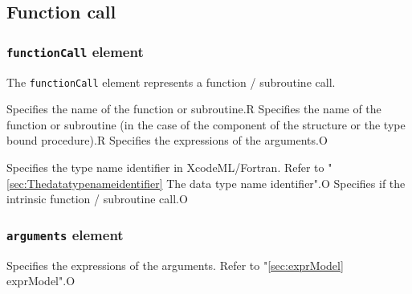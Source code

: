 \subsection{Function call}

\subsubsection{ {\tt functionCall} element}

The {\tt functionCall} element represents a function / subroutine call.


\begin{XcodeMLChildElements}
{Specifies the name of the function or subroutine.}{R}
{Specifies the name of the function or subroutine
 (in the case of the component of the structure or the type bound procedure).}{R}
{Specifies the expressions of the arguments.}{O}
\end{XcodeMLChildElements}

\begin{XcodeMLAttributes}
{Specifies the type name identifier in XcodeML/Fortran.
 Refer to "\ref{sec:Thedatatypenameidentifier} The data type name identifier".}{O}
{Specifies if the intrinsic function / subroutine call.}{O}
\end{XcodeMLAttributes}


\subsubsection{ {\tt arguments} element}


\begin{XcodeMLChildElements}
{Specifies the expressions of the arguments. Refer to "\ref{sec:exprModel} exprModel".}{O}
\end{XcodeMLChildElements}

